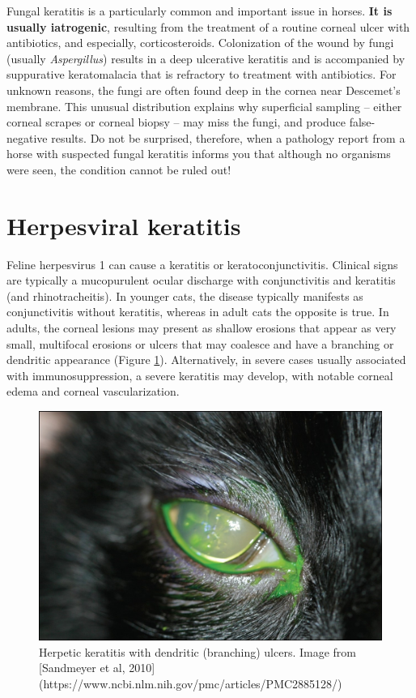 \documentclass[openany]{book}
\begin{document}
Fungal keratitis is a particularly common and important issue in horses.
\textbf{It is usually iatrogenic}, resulting from the treatment of a
routine corneal ulcer with antibiotics, and especially, corticosteroids.
Colonization of the wound by fungi (usually \emph{Aspergillus}) results
in a deep ulcerative keratitis and is accompanied by suppurative
keratomalacia that is refractory to treatment with antibiotics. For
unknown reasons, the fungi are often found deep in the cornea near
Descemet's membrane. This unusual distribution explains why superficial
sampling -- either corneal scrapes or corneal biopsy -- may miss the
fungi, and produce false-negative results. Do not be surprised,
therefore, when a pathology report from a horse with suspected fungal
keratitis informs you that although no organisms were seen, the
condition cannot be ruled out!

\section{Herpesviral keratitis}\label{herpesviral-keratitis}

Feline herpesvirus 1 can cause a keratitis or keratoconjunctivitis.
Clinical signs are typically a mucopurulent ocular discharge with
conjunctivitis and keratitis (and rhinotracheitis). In younger cats, the
disease typically manifests as conjunctivitis without keratitis, whereas
in adult cats the opposite is true. In adults, the corneal lesions may
present as shallow erosions that appear as very small, multifocal
erosions or ulcers that may coalesce and have a branching or dendritic
appearance (Figure \ref{fig:dendritic}). Alternatively, in severe cases
usually associated with immunosuppression, a severe keratitis may
develop, with notable corneal edema and corneal vascularization.

\begin{figure}

{\centering \includegraphics{images/dendritic_ulcer_feline} 

}

\caption{Herpetic keratitis with dendritic (branching) ulcers. Image from [Sandmeyer et al, 2010](https://www.ncbi.nlm.nih.gov/pmc/articles/PMC2885128/)}\label{fig:dendritic}
\end{figure}
\end{document}
